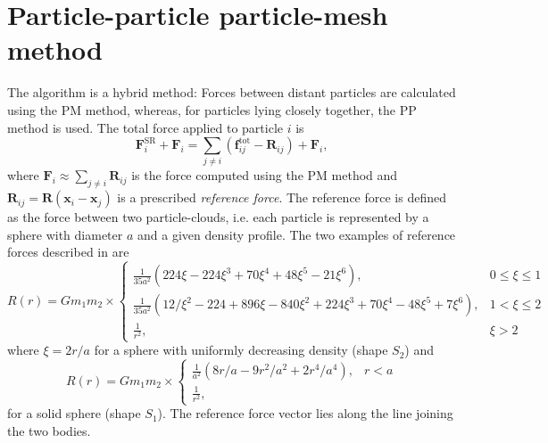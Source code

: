 \section{Particle-particle particle-mesh method}
The \PThreeM{} algorithm is a hybrid method:
Forces between distant particles are calculated using the PM method, whereas, for particles lying closely together, the PP method is used.
The total force applied to particle $i$ is
\begin{equation}\label{eq:p3m}
    \mathbf{F}_i^\text{SR} + \mathbf{F}_i = \sum_{j \neq i}(\mathbf{f}_{ij}^\text{tot} - \mathbf{R}_{ij}) + \mathbf{F}_i,
\end{equation}
where $\mathbf{F}_i \approx \sum_{j\neq i} \mathbf{R}_{ij}$ is the force computed using the PM method and $\mathbf{R}_{ij} = \mathbf{R}(\mathbf{x}_i - \mathbf{x}_j)$ is a prescribed \textit{reference force}.
The reference force is defined as the force between two particle-clouds, i.e. each particle is represented by a sphere with diameter $a$ and a given density profile.
The two examples of reference forces described in \cite{Hockney1988} are
\begin{equation*}
    R(r) =
    G m_1 m_2 \times\begin{cases}
        \frac{1}{35 a^2} (224 \xi - 224 \xi^3 + 70 \xi^4 + 48 \xi^5 - 21 \xi^6),                               & 0 \leq \xi \leq 1 \\
        \frac{1}{35 a^2} (12 / \xi^2 - 224 + 896 \xi - 840 \xi^2 + 224 \xi^3 + 70 \xi^4 - 48 \xi^5 + 7 \xi^6), & 1 < \xi \leq 2    \\
        \frac{1}{r^2},                                                                                         & \xi > 2
    \end{cases}
\end{equation*}
where $\xi = 2r/a$ for a sphere with uniformly decreasing density (shape $S_2$) and
\begin{equation}\label{eq:s1-reference-force}
    R(r) =
    G m_1 m_2 \times\begin{cases}
        \frac{1}{a^2} (8 r / a - 9 r^2 / a^2 + 2 r^4 / a^4), & r < a \\
        \frac{1}{r^2},
    \end{cases}
\end{equation}
for a solid sphere (shape $S_1$).
The reference force vector lies along the line joining the two bodies.

